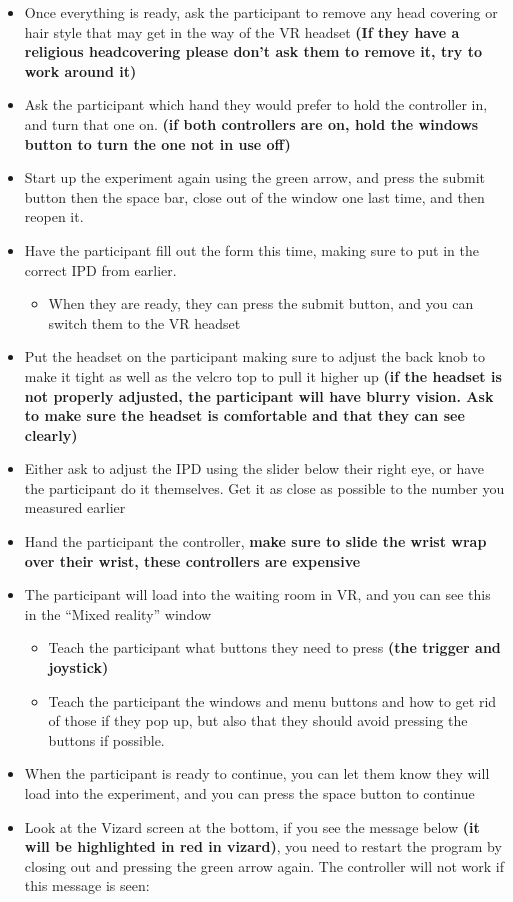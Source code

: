 \documentclass[
]{article}
\providecommand{\tightlist}{%
  \setlength{\itemsep}{0pt}\setlength{\parskip}{0pt}}
\begin{document}
\begin{itemize}
\item
  Once everything is ready, ask the participant to remove any head
  covering or hair style that may get in the way of the VR headset
  \textbf{(If they have a religious headcovering please don't ask them
  to remove it, try to work around it)}
\item
  Ask the participant which hand they would prefer to hold the
  controller in, and turn that one on. \textbf{(if both controllers are
  on, hold the windows button to turn the one not in use off)}
\item
  Start up the experiment again using the green arrow, and press the
  submit button then the space bar, close out of the window one last
  time, and then reopen it.
\item
  Have the participant fill out the form this time, making sure to put
  in the correct IPD from earlier.

  \begin{itemize}
  \tightlist
  \item
    When they are ready, they can press the submit button, and you can
    switch them to the VR headset
  \end{itemize}
\item
  Put the headset on the participant making sure to adjust the back knob
  to make it tight as well as the velcro top to pull it higher up
  \textbf{(if the headset is not properly adjusted, the participant will
  have blurry vision. Ask to make sure the headset is comfortable and
  that they can see clearly)}
\item
  Either ask to adjust the IPD using the slider below their right eye,
  or have the participant do it themselves. Get it as close as possible
  to the number you measured earlier
\item
  Hand the participant the controller, \textbf{make sure to slide the
  wrist wrap over their wrist, these controllers are expensive}
\item
  The participant will load into the waiting room in VR, and you can see
  this in the ``Mixed reality'' window

  \begin{itemize}
  \tightlist
  \item
    Teach the participant what buttons they need to press \textbf{(the
    trigger and joystick)}
  \item
    Teach the participant the windows and menu buttons and how to get
    rid of those if they pop up, but also that they should avoid
    pressing the buttons if possible.
  \end{itemize}
\item
  When the participant is ready to continue, you can let them know they
  will load into the experiment, and you can press the space button to
  continue
\item
  Look at the Vizard screen at the bottom, if you see the message below
  \textbf{(it will be highlighted in red in vizard)}, you need to
  restart the program by closing out and pressing the green arrow again.
  The controller will not work if this message is seen:
\end{itemize}
\end{document}
